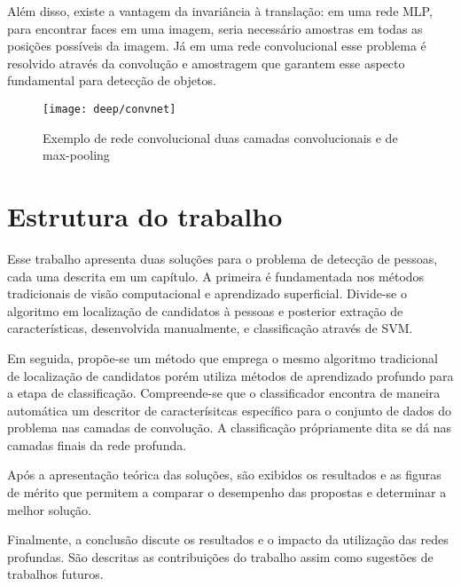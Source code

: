 Além disso, existe a vantagem da invariância à translação: em uma rede MLP, para encontrar faces em uma imagem, seria necessário amostras em todas as posições possíveis da imagem. Já em uma rede convolucional esse problema é resolvido através da convolução e amostragem que garantem esse aspecto fundamental para detecção de objetos.

\begin{figure}
\centering
\texttt{[image: deep/convnet]}
\caption{Exemplo de rede convolucional duas camadas convolucionais e de max-pooling}
\label{fig:convnet}
\end{figure}

\section{Estrutura do trabalho}
Esse trabalho apresenta duas soluções para o problema de detecção de pessoas, cada uma descrita em um capítulo. A primeira é fundamentada nos métodos tradicionais de visão computacional e aprendizado superficial. Divide-se o algoritmo em localização de candidatos à pessoas e posterior extração de características, desenvolvida manualmente, e classificação através de SVM.

Em seguida, propõe-se um método que emprega o mesmo algoritmo tradicional de localização de candidatos porém utiliza métodos de aprendizado profundo para a etapa de classificação. Compreende-se que o classificador encontra de maneira automática um descritor de caracterísitcas específico para o conjunto de dados do problema nas camadas de convolução. A classificação própriamente dita se dá nas camadas finais da rede profunda.

Após a apresentação teórica das soluções, são exibidos os resultados e as figuras de mérito que permitem a comparar o desempenho das propostas e determinar a melhor solução.

Finalmente, a conclusão discute os resultados e o impacto da utilização das redes profundas. São descritas as contribuições do trabalho assim como sugestões de trabalhos futuros.



